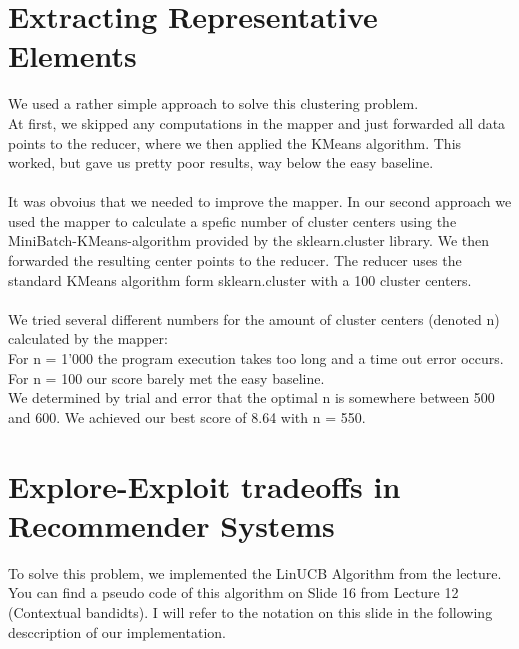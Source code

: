 \documentclass[a4paper, 11pt]{article}
\begin{document}
\section*{Extracting Representative Elements} 
We used a rather simple approach to solve this clustering problem.\\At first, we skipped any computations in the mapper and just forwarded all data points to the reducer, where we then applied the KMeans algorithm. This worked, but gave us pretty poor results, way below the easy baseline.\\\\
It was obvoius that we needed to improve the mapper. In our second approach we used the mapper to calculate a spefic number of cluster centers using the MiniBatch-KMeans-algorithm provided by the sklearn.cluster library. We then forwarded the resulting center points to the reducer. The reducer uses the standard KMeans algorithm form sklearn.cluster with a 100 cluster centers.\\\\
We tried several different numbers for the amount of cluster centers (denoted n) calculated by the mapper:\\For n = 1'000 the program execution takes too long and a time out error occurs.\\ For n = 100 our score barely met the easy baseline. \\ We determined by trial and error that the optimal n is somewhere between 500 and 600. We achieved our best score of 8.64 with n = 550.
\newpage

\section*{Explore-Exploit tradeoffs in Recommender Systems}
To solve this problem, we implemented the LinUCB Algorithm from the lecture. You can find a pseudo code of this algorithm on Slide 16 from Lecture 12 (Contextual bandidts). I will refer to the notation on this slide in the following desccription of our implementation. 
\end{document}
